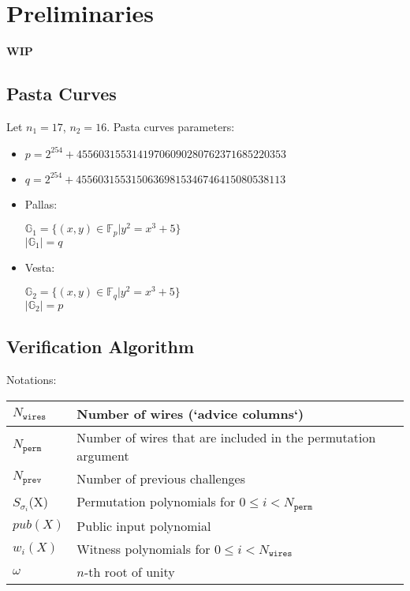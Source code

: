 \section{Preliminaries}
\label{section:preliminaries}
\textbf{WIP}
\subsection{Pasta Curves}

Let $n_1 = 17$, $n_2 = 16$.
Pasta curves parameters:
\begin{itemize}
	\item $p = 2^254 + 45560315531419706090280762371685220353$
	\item $q = 2^254 + 45560315531506369815346746415080538113$
	\item Pallas:
		\begin{center}
			$\mathbb{G}_1 = \{ (x, y) \in \mathbb{F}_p | y^2 = x^3 + 5 \}$ \\
			$|\mathbb{G}_1| = q$
		\end{center}
	\item Vesta:
		\begin{center}
			$\mathbb{G}_2 = \{ (x, y) \in \mathbb{F}_q | y^2 = x^3 + 5 \}$ \\
			$|\mathbb{G}_2| = p$
		\end{center}
\end{itemize}

\subsection{Verification Algorithm}

Notations:

\begin{center}
\begin{table}[H]
\begin{tabular}{| l | l |}
 	\hline
	$N_{\texttt{wires}}$ & Number of wires (`advice columns`) \\
	\hline
	$N_{\texttt{perm}}$ & Number of wires that are included in the permutation argument \\
	\hline
	$N_{\texttt{prev}}$ & Number of previous challenges \\
	\hline
	$S_{\sigma_i}$(X) & Permutation polynomials for $0 \leq i < N_{\texttt{perm}}$ \\
	\hline
	$pub(X)$ & Public input polynomial \\
	\hline
	$w_i(X)$ & Witness polynomials for $0 \leq i < N_{\texttt{wires}}$\\
	\hline
	$\omega$ & $n$-th root of unity \\
	\hline
\end{tabular}
\end{table}
\end{center}

